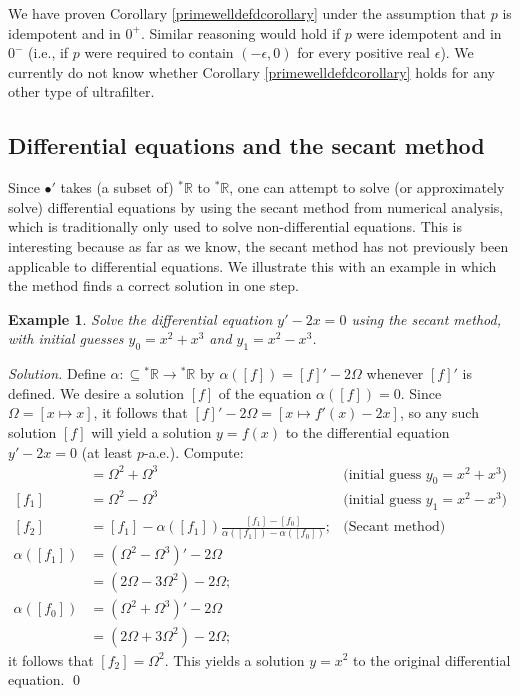 \documentclass[microtype]{jloganal}
\newtheorem{example}[theorem]{Example}
\begin{document}
We have proven Corollary \ref{primewelldefdcorollary}
under the assumption that $p$ is idempotent and in $0^+$. Similar reasoning
would hold if $p$ were idempotent and in $0^-$ (i.e., if $p$ were required to
contain $(-\epsilon,0)$ for every positive real $\epsilon$). We currently do not
know whether Corollary \ref{primewelldefdcorollary} holds for any other
type of ultrafilter.

\subsection{Differential equations and the secant method}

Since $\bullet'$ takes (a subset of) ${}^*\mathbb R$ to ${}^*\mathbb R$,
one can attempt to solve (or approximately solve) differential
equations by using the secant method from numerical analysis,
which is traditionally only used to solve non-differential equations.
This is interesting because as far as we know, the secant method has not
previously been applicable to differential equations.
We illustrate this with an example in which the method finds a
correct solution in one step.

\begin{example}
    Solve the differential equation $y'-2x=0$ using the secant method,
    with initial guesses $y_0=x^2+x^3$ and $y_1=x^2-x^3$.
\end{example}

\textit{Solution.}
    Define $\alpha:{\subseteq}{}^*\mathbb R\to{}^*\mathbb R$ by
    $\alpha([f])=[f]'-2\Omega$ whenever $[f]'$ is defined.
    We desire a solution $[f]$ of the equation $\alpha([f])=0$.
    Since $\Omega=[x\mapsto x]$, it follows that $[f]'-2\Omega=[x\mapsto f'(x)-2x]$,
    so any such solution $[f]$ will yield a solution $y=f(x)$ to
    the differential equation $y'-2x=0$ (at least $p$-a.e.). Compute:
    \begin{align*}
        [f_0] &= \Omega^2+\Omega^3
            &\mbox{(initial guess $y_0=x^2+x^3$)}\\
        [f_1] &= \Omega^2-\Omega^3
            &\mbox{(initial guess $y_1=x^2-x^3$)}\\
        [f_2] &= [f_1] - \alpha([f_1])
            \frac{[f_1]-[f_0]}{\alpha([f_1])-\alpha([f_0])};
                &\mbox{(Secant method)}\\
        \alpha([f_1]) &= (\Omega^2-\Omega^3)'-2\Omega\\
            &= (2\Omega-3\Omega^2)-2\Omega;\\
        \alpha([f_0]) &= (\Omega^2+\Omega^3)'-2\Omega\\
            &= (2\Omega+3\Omega^2)-2\Omega;
    \end{align*}
    it follows that $[f_2]=\Omega^2$.
    This yields a solution $y=x^2$ to the original differential equation.
    \qed
\end{document}
